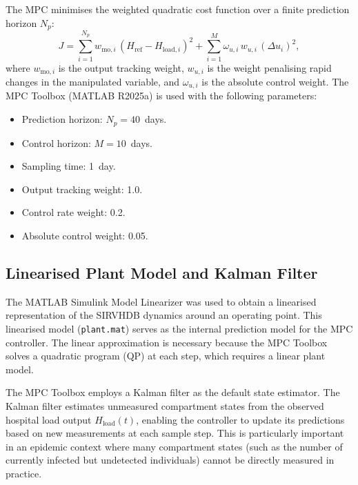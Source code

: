 The MPC minimises the weighted quadratic cost function over a finite prediction horizon $N_p$:
\begin{equation}
  J = \sum_{i=1}^{N_p} w_{{\mathrm{mo}},i}\,(H_{{\mathrm{ref}}} - H_{{\mathrm{load}},i})^2 + \sum_{i=1}^{M} \omega_{u,i}\,w_{u,i}\,(\Delta u_i)^2,
  \label{eq:mpc_cost}
\end{equation}
where $w_{{\mathrm{mo}},i}$ is the output tracking weight, $w_{u,i}$ is the weight penalising rapid changes in the manipulated variable, and $\omega_{u,i}$ is the absolute control weight.
The MPC Toolbox (MATLAB R2025a) is used with the following parameters:
\begin{itemize}
  \item Prediction horizon: $N_p = 40$~days.
  \item Control horizon: $M = 10$~days.
  \item Sampling time: 1~day.
  \item Output tracking weight: 1.0.
  \item Control rate weight: 0.2.
  \item Absolute control weight: 0.05.
\end{itemize}

\subsection{Linearised Plant Model and Kalman Filter}
\label{sec:kalman}

The MATLAB Simulink Model Linearizer was used to obtain a linearised representation of the SIRVHDB dynamics around an operating point.
This linearised model (\texttt{plant.mat}) serves as the internal prediction model for the MPC controller.
The linear approximation is necessary because the MPC Toolbox solves a quadratic program (QP) at each step, which requires a linear plant model.

The MPC Toolbox employs a Kalman filter as the default state estimator.
The Kalman filter estimates unmeasured compartment states from the observed hospital load output $H_{\mathrm{load}}(t)$, enabling the controller to update its predictions based on new measurements at each sample step.
This is particularly important in an epidemic context where many compartment states (such as the number of currently infected but undetected individuals) cannot be directly measured in practice.
